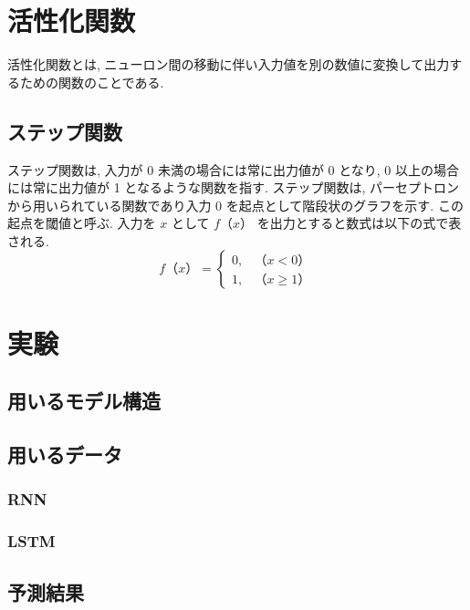 \section{活性化関数}
活性化関数とは, ニューロン間の移動に伴い入力値を別の数値に変換して出力するための関数のことである.
\subsection{ステップ関数}
ステップ関数は, 入力が 0 未満の場合には常に出力値が 0 となり, 0 以上の場合には常に出力値が 1 となるような関数を指す. ステップ関数は, パーセプトロンから用いられている関数であり入力 0 を起点として階段状のグラフを示す. この起点を閾値と呼ぶ. 入力を $x$ として $f（x）$ を出力とすると数式は以下の式で表される.
\begin{equation}
f（x）= \begin{cases}
0, & （x < 0）\\
1, & （x \geq 1）
\end{cases}
\end{equation}

\section{実験}
\subsection{用いるモデル構造}

\subsection{用いるデータ}


\subsubsection{RNN}

\subsubsection{LSTM}


\subsection{予測結果}

